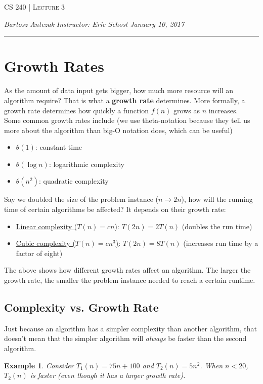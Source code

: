 \documentclass{report}
\newcommand{\lectureNum}{3}
\newcommand{\curDate}{January 10, 2017}
\newcommand{\course}{CS 240}
\newtheorem{ex}{Example}[section]
\begin{document}
\begin{center}
\begin{Large}
\textsc{\course{} | Lecture \lectureNum{}}
\end{Large}
\end{center} 
\noindent \textit{Bartosz Antczak} \hfill
\textit{Instructor: Eric Schost} \hfill
\textit{\curDate{}}
\rule{\textwidth}{0.4pt}

\section{Growth Rates}
As the amount of data input gets bigger, how much more resource will an algorithm require? That is what a \textbf{growth rate} determines. More formally, a growth rate determines how quickly a function $f(n)$ grows as $n$ increases.\\
Some common growth rates include (we use theta-notation because they tell us more about the algorithm than big-O notation does, which can be useful)
\begin{itemize}
\item $\theta(1)$: constant time
\item $\theta(\log n)$: logarithmic complexity
\item $\theta(n^2)$: quadratic complexity
\end{itemize} 
Say we doubled the size of the problem instance ($n \rightarrow 2n$), how will the running time of certain algorithms be affected? It depends on their growth rate:
\begin{itemize}
\item \underline{Linear complexity ($T(n) = cn$)}: $T(2n) = 2T(n)$ (doubles the run time)
\item \underline{Cubic complexity ($T(n) = cn^3$)}: $T(2n) = 8T(n)$ (increases run time by a factor of eight)
\end{itemize}
The above shows how different growth rates affect an algorithm. The larger the growth rate, the smaller the problem instance needed to reach a certain runtime.
\subsection{Complexity vs. Growth Rate}
Just because an algorithm has a simpler complexity than another algorithm, that doesn't mean that the simpler algorithm will \textit{always} be faster than the second algorithm.
\begin{ex}
Consider $T_1(n) = 75n + 100 $ and $T_2(n) = 5n^2$. When $n < 20$, $T_2(n)$ is faster (even though it has a larger growth rate).
\end{ex}
\end{document}
